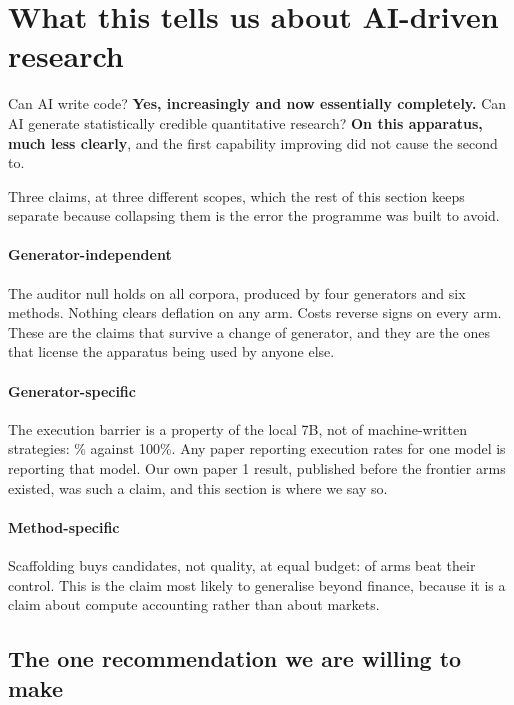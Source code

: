 \documentclass[11pt,a4paper]{article}
\begin{document}
\section{What this tells us about AI-driven research}
\label{sec:meaning}

\begin{finding}
Can AI write code? \textbf{Yes, increasingly and now essentially completely.} Can AI generate
statistically credible quantitative research? \textbf{On this apparatus, much less clearly}, and
the first capability improving did not cause the second to.
\end{finding}

Three claims, at three different scopes, which the rest of this section keeps separate because
collapsing them is the error the programme was built to avoid.

\paragraph{Generator-independent \tagindep} The auditor null holds on all
\pgmNullCorpora{} corpora, produced by four generators and six methods. Nothing clears deflation
on any arm. Costs reverse signs on every arm. These are the claims that survive a change of
generator, and they are the ones that license the apparatus being used by anyone else.

\paragraph{Generator-specific \taglocal\ \tagfrontier} The execution barrier is a property of the
local 7B, not of machine-written strategies: \pgmLocalTrade\% against 100\%. Any paper reporting
execution rates for one model is reporting that model. Our own paper 1 result, published before
the frontier arms existed, was such a claim, and this section is where we say so.

\paragraph{Method-specific \tagmethod} Scaffolding buys candidates, not quality, at equal budget:
\pgmScaffoldWins{} of \pgmScaffoldArms{} arms beat their control. This is the claim most likely to
generalise beyond finance, because it is a claim about compute accounting rather than about
markets.

\subsection{The one recommendation we are willing to make}
\end{document}
